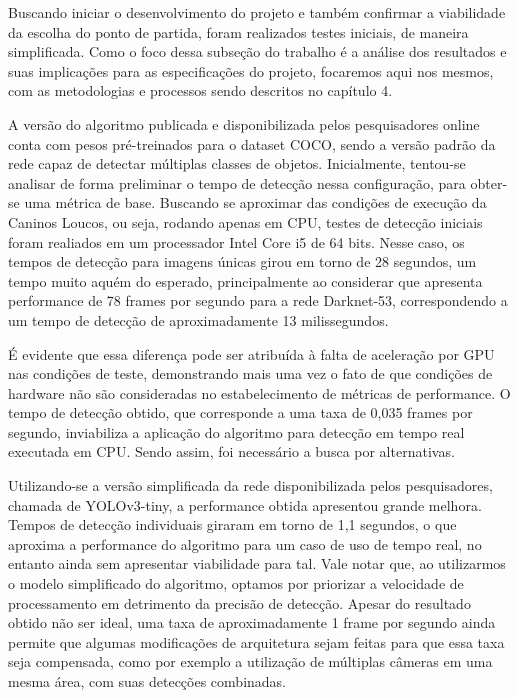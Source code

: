 \documentclass[]{politex}
\begin{document}
Buscando iniciar o desenvolvimento do projeto e também confirmar a viabilidade da escolha do ponto de partida, foram realizados testes iniciais, de maneira simplificada. Como o foco dessa subseção do trabalho é a análise dos resultados e suas implicações para as especificações do projeto, focaremos aqui nos mesmos, com as metodologias e processos sendo descritos no capítulo 4.

A versão do algoritmo publicada e disponibilizada pelos pesquisadores online conta com pesos pré-treinados para o dataset COCO\cite{coco}, sendo a versão padrão da rede capaz de detectar múltiplas classes de objetos. Inicialmente, tentou-se analisar de forma preliminar o tempo de detecção nessa configuração, para obter-se uma métrica de base. Buscando se aproximar das condições de execução da Caninos Loucos, ou seja, rodando apenas em CPU, testes de detecção iniciais foram realiados em um processador Intel Core i5 de 64 bits. Nesse caso, os tempos de detecção para imagens únicas girou em torno de 28 segundos, um tempo muito aquém do esperado, principalmente ao considerar que \citeyear{yolov3} \citeauthor{yolov3} apresenta performance de 78 frames por segundo para a rede Darknet-53, correspondendo a um tempo de detecção de aproximadamente 13 milissegundos.

É evidente que essa diferença pode ser atribuída à falta de aceleração por GPU nas condições de teste, demonstrando mais uma vez o fato de que condições de hardware não são consideradas no estabelecimento de métricas de performance. O tempo de detecção obtido, que corresponde a uma taxa de 0,035 frames por segundo, inviabiliza a aplicação do algoritmo para detecção em tempo real executada em CPU. Sendo assim, foi necessário a busca por alternativas.

Utilizando-se a versão simplificada da rede disponibilizada pelos pesquisadores, chamada de YOLOv3-tiny, a performance obtida apresentou grande melhora. Tempos de detecção individuais giraram em torno de 1,1 segundos, o que aproxima a performance do algoritmo para um caso de uso de tempo real, no entanto ainda sem apresentar viabilidade para tal. Vale notar que, ao utilizarmos o modelo simplificado do algoritmo, optamos por priorizar a velocidade de processamento em detrimento da precisão de detecção. Apesar do resultado obtido não ser ideal, uma taxa de aproximadamente 1 frame por segundo ainda permite que algumas modificações de arquitetura sejam feitas para que essa taxa seja compensada, como por exemplo a utilização de múltiplas câmeras em uma mesma área, com suas detecções combinadas. 
\end{document}
